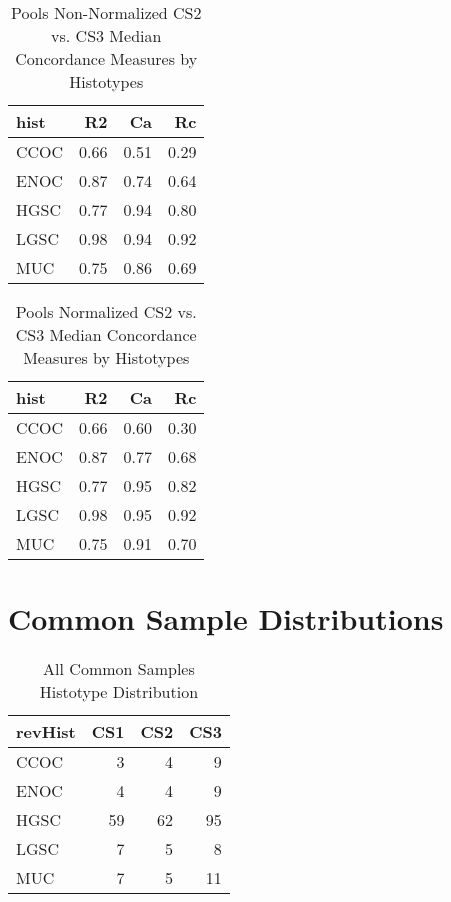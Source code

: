 \documentclass[
]{report}
\begin{document}
\begin{table}

\caption{\label{tab:pools-cs2non-vs-cs3}Pools Non-Normalized CS2 vs. CS3 Median Concordance Measures by Histotypes}
\centering
\begin{tabular}[t]{l|r|r|r}
\hline
hist & R2 & Ca & Rc\\
\hline
CCOC & 0.66 & 0.51 & 0.29\\
\hline
ENOC & 0.87 & 0.74 & 0.64\\
\hline
HGSC & 0.77 & 0.94 & 0.80\\
\hline
LGSC & 0.98 & 0.94 & 0.92\\
\hline
MUC & 0.75 & 0.86 & 0.69\\
\hline
\end{tabular}
\end{table}

\begin{table}

\caption{\label{tab:pools-cs2norm-vs-cs3}Pools Normalized CS2 vs. CS3 Median Concordance Measures by Histotypes}
\centering
\begin{tabular}[t]{l|r|r|r}
\hline
hist & R2 & Ca & Rc\\
\hline
CCOC & 0.66 & 0.60 & 0.30\\
\hline
ENOC & 0.87 & 0.77 & 0.68\\
\hline
HGSC & 0.77 & 0.95 & 0.82\\
\hline
LGSC & 0.98 & 0.95 & 0.92\\
\hline
MUC & 0.75 & 0.91 & 0.70\\
\hline
\end{tabular}
\end{table}

\hypertarget{common-sample-distributions}{%
\section{Common Sample Distributions}\label{common-sample-distributions}}

\begin{table}

\caption{\label{tab:common-dist-all}All Common Samples Histotype Distribution}
\centering
\begin{tabular}[t]{l|r|r|r}
\hline
revHist & CS1 & CS2 & CS3\\
\hline
CCOC & 3 & 4 & 9\\
\hline
ENOC & 4 & 4 & 9\\
\hline
HGSC & 59 & 62 & 95\\
\hline
LGSC & 7 & 5 & 8\\
\hline
MUC & 7 & 5 & 11\\
\hline
\end{tabular}
\end{table}
\end{document}
